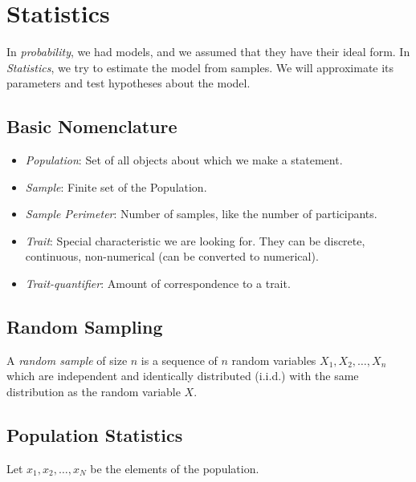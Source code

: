 \chapter{Statistics}

In \emph{probability}, we had models, and we assumed that they have their ideal form. 
In \emph{Statistics}, we try to estimate the model from samples. We will approximate its parameters and 
test hypotheses about the model. 

\section{Basic Nomenclature}

\begin{itemize}

    \item \emph{Population}: Set of all objects about which we make a statement.

    \item \emph{Sample}: Finite set of the Population. 

    \item \emph{Sample Perimeter}: Number of samples, like the number of participants. 

    \item \emph{Trait}: Special characteristic we are looking for. They can be discrete, continuous, non-numerical (can be converted to numerical).

    \item \emph{Trait-quantifier}: Amount of correspondence to a trait.
     
\end{itemize}

\section{Random Sampling}

A \emph{random sample} of size \(n\) is a sequence of \(n\) random variables \(X_1, X_2, \dots, X_n\) which are independent and identically distributed 
(i.i.d.) with the same distribution as the random variable \(X\).

\section{Population Statistics}

Let \(x_1, x_2, \dots, x_N\) be the elements of the population. 

